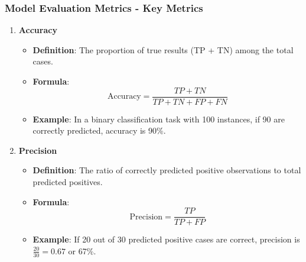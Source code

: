 \documentclass[aspectratio=169]{beamer}
\begin{document}
\begin{frame}[fragile]
    \frametitle{Model Evaluation Metrics - Key Metrics}
    \begin{enumerate}
        \item \textbf{Accuracy}
        \begin{itemize}
            \item \textbf{Definition}: The proportion of true results (TP + TN) among the total cases.
            \item \textbf{Formula}:
            \begin{equation}
            \text{Accuracy} = \frac{TP + TN}{TP + TN + FP + FN}
            \end{equation}
            \item \textbf{Example}: In a binary classification task with 100 instances, if 90 are correctly predicted, accuracy is 90\%.
        \end{itemize}
        
        \item \textbf{Precision}
        \begin{itemize}
            \item \textbf{Definition}: The ratio of correctly predicted positive observations to total predicted positives.
            \item \textbf{Formula}:
            \begin{equation}
            \text{Precision} = \frac{TP}{TP + FP}
            \end{equation}
            \item \textbf{Example}: If 20 out of 30 predicted positive cases are correct, precision is \( \frac{20}{30} = 0.67\) or 67\%.
        \end{itemize}
    \end{enumerate}
\end{frame}
\end{document}
